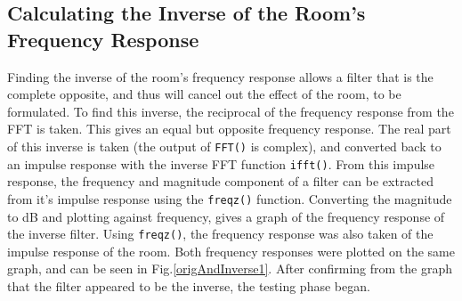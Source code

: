 \documentclass[conference]{IEEEtran}
\def\code#1{\texttt{#1}}
\begin{document}
    \subsection{Calculating the Inverse of the Room's Frequency Response}  
        Finding the inverse of the room's frequency response allows a filter that is the complete opposite, and thus will cancel out the effect of the room, to be formulated.
        To find this inverse, the reciprocal of the frequency response from the FFT is taken.
        This gives an equal but opposite frequency response.
        The real part of this inverse is taken (the output of \code{FFT()} is complex), and converted back to an impulse response with the inverse FFT function \code{ifft()}.
        From this impulse response, the frequency and magnitude component of a filter can be extracted from it's impulse response using the \code{freqz()} function.
        Converting the magnitude to dB and plotting against frequency, gives a graph of the frequency response of the inverse filter.
        Using  \code{freqz()}, the frequency response was also taken of the impulse response of the room.
        Both frequency responses were plotted on the same graph, and can be seen in Fig.\ref{origAndInverse1}.
        After confirming from the graph that the filter appeared to be the inverse, the testing phase began.
\end{document}
